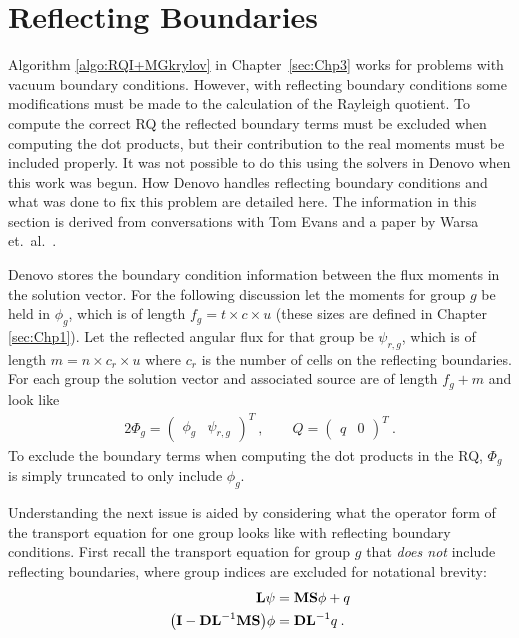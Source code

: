 
\chapter{Reflecting Boundaries}
\label{sec:AppendixC}

Algorithm \ref{algo:RQI+MGkrylov} in Chapter~\ref{sec:Chp3} works for problems with vacuum boundary conditions. However, with reflecting boundary conditions some modifications must be made to the calculation of the Rayleigh quotient. To compute the correct RQ the reflected boundary terms must be excluded when computing the dot products, but their contribution to the real moments must be included properly. It was not possible to do this using the solvers in Denovo when this work was begun. How Denovo handles reflecting boundary conditions and what was done to fix this problem are detailed here. The information in this section is derived from conversations with Tom Evans \cite{Evans2011a} and a paper by Warsa et.\ al.\ \cite{Warsa2004}.

Denovo stores the boundary condition information between the flux moments in the solution vector. For the following discussion let the moments for group $g$ be held in $\phi_{g}$, which is of length $f_{g} = t \times c \times u$ (these sizes are defined in Chapter \ref{sec:Chp1}). Let the reflected angular flux for that group be $\psi_{r,g}$, which is of length $m = n \times c_{r} \times u$ where $c_{r}$ is the number of cells on the reflecting boundaries. For each group the solution vector and associated source are of length $f_{g} + m$ and look like
%
\begin{alignat}{2}
 \Phi_{g} = \begin{pmatrix} \phi_{g} & \psi_{r,g} \end{pmatrix}^{T} \:, \qquad Q = \begin{pmatrix} q & 0 \end{pmatrix}^{T} \:.
\label{eq:reflFlux}
\end{alignat}
%
To exclude the boundary terms when computing the dot products in the RQ, $\Phi_{g}$ is simply truncated to only include $\phi_{g}$. 

Understanding the next issue is aided by considering what the operator form of the transport equation for one group looks like with reflecting boundary conditions. First recall the transport equation for group $g$ that \emph{does not} include reflecting boundaries, where group indices are excluded for notational brevity:
%
\begin{align}
  \mathbf{L} \psi &= \mathbf{MS}\phi + q
  \label{eq:transport} \\
  \bigl(\mathbf{I} - \mathbf{DL}^{-1}\mathbf{MS} \bigr) \phi &= \mathbf{DL}^{-1}q \:.
  \label{eq:transportMoments}
\end{align}

